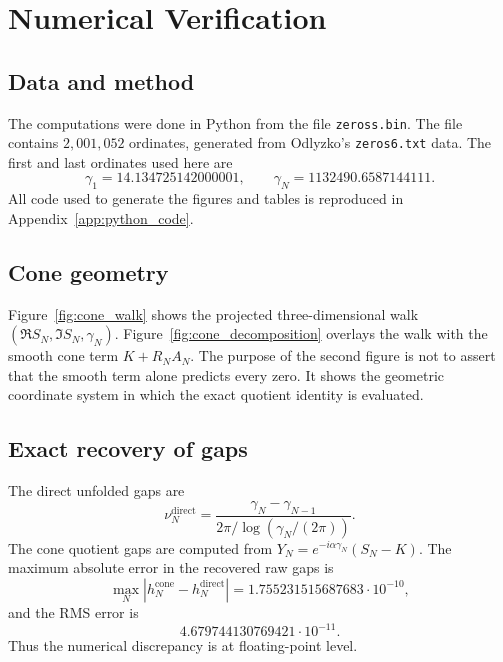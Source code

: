 \documentclass[11pt]{amsart}
\numberwithin{equation}{section}
\theoremstyle{plain}
\theoremstyle{definition}
\theoremstyle{remark}
\begin{document}
\section{Numerical Verification}
\label{sec:numerical_verification}

\subsection{Data and method}
\label{subsec:data_method}

The computations were done in Python from the file \texttt{zeross.bin}. The file contains $2{,}001{,}052$ ordinates, generated from Odlyzko's \texttt{zeros6.txt} data. The first and last ordinates used here are
\begin{equation}
\gamma_1=14.134725142000001,
\qquad
\gamma_N=1132490.6587144111.
\label{eq:first_last_zero}
\end{equation}
All code used to generate the figures and tables is reproduced in Appendix~\ref{app:python_code}.

\subsection{Cone geometry}
\label{subsec:cone_geometry}

Figure~\ref{fig:cone_walk} shows the projected three-dimensional walk $(\Re S_N,\Im S_N,\gamma_N)$. Figure~\ref{fig:cone_decomposition} overlays the walk with the smooth cone term $K+R_NA_N$. The purpose of the second figure is not to assert that the smooth term alone predicts every zero. It shows the geometric coordinate system in which the exact quotient identity is evaluated.

\subsection{Exact recovery of gaps}
\label{subsec:exact_recovery}

The direct unfolded gaps are
\begin{equation}
\nu_N^{\mathrm{direct}}=\frac{\gamma_N-\gamma_{N-1}}{2\pi/\log(\gamma_N/(2\pi))}.
\label{eq:direct_unfolded_gaps}
\end{equation}
The cone quotient gaps are computed from $Y_N=e^{-i\alpha\gamma_N}(S_N-K)$. The maximum absolute error in the recovered raw gaps is
\begin{equation}
\max_N\left|h_N^{\mathrm{cone}}-h_N^{\mathrm{direct}}\right|
=1.755231515687683\cdot10^{-10},
\label{eq:max_gap_error}
\end{equation}
and the RMS error is
\begin{equation}
4.679744130769421\cdot10^{-11}.
\label{eq:rms_gap_error}
\end{equation}
Thus the numerical discrepancy is at floating-point level.
\end{document}
